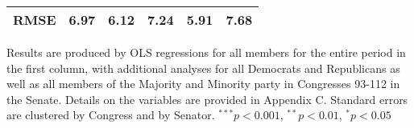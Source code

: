 \documentclass[12pt]{article}
\begin{document}
\begin{table}[H]
\begin{threeparttable}
\begin{tabular}{l c c c c c }
RMSE                  & 6.97          & 6.12         & 7.24           & 5.91         & 7.68         \\
\hline
\end{tabular}
\begin{tablenotes}
   \item
   Results are produced by OLS regressions for all members for the entire period in the first column, with additional analyses for all Democrats and Republicans as well as all members of the Majority and Minority party in Congresses 93-112 in the Senate. Details on the variables are provided in Appendix C.
   Standard errors are clustered by Congress and by Senator.
$^{***}p<0.001$, $^{**}p<0.01$, $^*p<0.05$
 \end{tablenotes}
\end{threeparttable}
\end{table}



\end{document}

